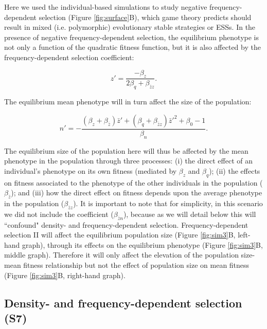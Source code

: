 \documentclass{article}
\begin{document}
\noindent Here we used the individual-based simulations to study negative frequency-dependent selection (Figure \ref{fig:surface}B), which game theory predicts should result in mixed (i.e. polymorphic) evolutionary stable strategies or ESSs. In the presence of negative frequency-dependent selection, the equilibrium phenotype is not only a function of the quadratic fitness function, but it is also affected by the frequency-dependent selection coefficient:

\begin{equation} 
z'=\frac{-\beta_{z}}{2\beta_{q} + \beta_{\bar{z}z}}.
\end{equation} 

\noindent The equilibrium mean phenotype will in turn affect the size of the population:

\begin{equation}
n' = -\frac{(\beta_{z}   + \beta_{\bar{z}})\bar{z}' + (\beta_{q} + \beta_{\bar{z}z})\bar{z}'^2+\beta_{0} -1}{\beta_{n}}.
\end{equation}

\noindent The equilibrium size of the population here will thus be affected by the mean phenotype in the population through three processes: (i) the direct effect of an individual's phenotype on its own fitness (mediated by $\beta_z$ and $ \beta_q$); (ii) the effects on fitness associated to the phenotype of the other individuals in the population ($\beta_{\bar{z}}$); and (iii) how the direct effect on fitness depends upon the average phenotype in the population ($\beta_{\bar{z}z}$). It is important to note that for simplicity, in this scenario we did not include the coefficient ($\beta_{\bar{z}n}$), because as we will detail below this will ``confound" density- and frequency-dependent selection. Frequency-dependent selection II will affect the equilibrium population size (Figure \ref{fig:sim3}B, left-hand graph), through its effects on the equilibrium phenotype (Figure \ref{fig:sim3}B, middle graph). Therefore it will only affect the elevation of the population size-mean fitness relationship but not the effect of population size on mean fitness (Figure \ref{fig:sim3}B, right-hand graph).
 
 
 


\subsection{Density- and frequency-dependent selection (S7)}
\end{document}
